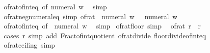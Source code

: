 \begin{isabellebody}
%
\isatagproof
{}\isamarkupfalse%
\ of{\isacharunderscore}{\kern0pt}rat{\isacharunderscore}{\kern0pt}of{\isacharunderscore}{\kern0pt}int{\isacharunderscore}{\kern0pt}eq\ {\isacharbrackleft}{\kern0pt}of\ {\isachardoublequoteopen}numeral\ w{\isachardoublequoteclose}{\isacharbrackright}{\kern0pt}\ \isamarkupfalse%
\ simp%
\endisatagproof
{\isafoldproof}%
%
\isadelimproof
\isanewline
%
\endisadelimproof
\isanewline
{}\isamarkupfalse%
\ of{\isacharunderscore}{\kern0pt}rat{\isacharunderscore}{\kern0pt}neg{\isacharunderscore}{\kern0pt}numeral{\isacharunderscore}{\kern0pt}eq\ {\isacharbrackleft}{\kern0pt}simp{\isacharbrackright}{\kern0pt}{\isacharcolon}{\kern0pt}\ {\isachardoublequoteopen}of{\isacharunderscore}{\kern0pt}rat\ {\isacharparenleft}{\kern0pt}{\isacharminus}{\kern0pt}\ numeral\ w{\isacharparenright}{\kern0pt}\ {\isacharequal}{\kern0pt}\ {\isacharminus}{\kern0pt}\ numeral\ w{\isachardoublequoteclose}\isanewline
%
\isadelimproof
\ \ %
\endisadelimproof
%
\isatagproof
{}\isamarkupfalse%
\ of{\isacharunderscore}{\kern0pt}rat{\isacharunderscore}{\kern0pt}of{\isacharunderscore}{\kern0pt}int{\isacharunderscore}{\kern0pt}eq\ {\isacharbrackleft}{\kern0pt}of\ {\isachardoublequoteopen}{\isacharminus}{\kern0pt}\ numeral\ w{\isachardoublequoteclose}{\isacharbrackright}{\kern0pt}\ \isamarkupfalse%
\ simp%
\endisatagproof
{\isafoldproof}%
%
\isadelimproof
\isanewline
%
\endisadelimproof
\isanewline
{}\isamarkupfalse%
\ of{\isacharunderscore}{\kern0pt}rat{\isacharunderscore}{\kern0pt}floor\ {\isacharbrackleft}{\kern0pt}simp{\isacharbrackright}{\kern0pt}{\isacharcolon}{\kern0pt}\isanewline
\ \ {\isachardoublequoteopen}{\isasymlfloor}of{\isacharunderscore}{\kern0pt}rat\ r{\isasymrfloor}\ {\isacharequal}{\kern0pt}\ {\isasymlfloor}r{\isasymrfloor}{\isachardoublequoteclose}\isanewline
%
\isadelimproof
\ \ %
\endisadelimproof
%
\isatagproof
{}\isamarkupfalse%
\ {\isacharparenleft}{\kern0pt}cases\ r{\isacharparenright}{\kern0pt}\ {\isacharparenleft}{\kern0pt}simp\ add{\isacharcolon}{\kern0pt}\ Fract{\isacharunderscore}{\kern0pt}of{\isacharunderscore}{\kern0pt}int{\isacharunderscore}{\kern0pt}quotient\ of{\isacharunderscore}{\kern0pt}rat{\isacharunderscore}{\kern0pt}divide\ floor{\isacharunderscore}{\kern0pt}divide{\isacharunderscore}{\kern0pt}of{\isacharunderscore}{\kern0pt}int{\isacharunderscore}{\kern0pt}eq{\isacharparenright}{\kern0pt}%
\endisatagproof
{\isafoldproof}%
%
\isadelimproof
\isanewline
%
\endisadelimproof
\isanewline
{}\isamarkupfalse%
\ of{\isacharunderscore}{\kern0pt}rat{\isacharunderscore}{\kern0pt}ceiling\ {\isacharbrackleft}{\kern0pt}simp{\isacharbrackright}{\kern0pt}{\isacharcolon}{\kern0pt}\isanewline

\end{isabellebody}
